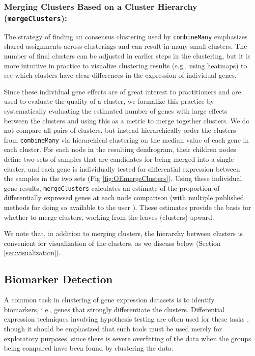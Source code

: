 \documentclass[10pt,letterpaper]{article}
\newcommand{\f}[1]{\texttt{#1}}
\begin{document}
\subsubsection{Merging Clusters Based on a Cluster Hierarchy  (\f{mergeClusters}):} 
\label{sec:dendAndMerge}

The strategy of finding an consensus clustering used by \f{combineMany} emphasizes shared assignments across clusterings and can result in many small clusters. The number of final clusters can be adjusted in earlier steps in the clustering, but it is more intuitive in practice to visualize clustering results (e.g., using heatmaps) to see which clusters have clear differences in the expression of individual genes. 

Since these individual gene effects are of great interest to practitioners and are used to evaluate the quality of a cluster, we formalize this practice by systematically evaluating the estimated number of genes with large effects between the clusters and using this as a metric to merge together clusters.  We do not compare all pairs of clusters, but instead hierarchically order the clusters from \f{combineMany} via hierarchical clustering on the median value of each gene in each cluster. For each node in the resulting dendrogram, their children nodes define two sets of samples that are candidates for being merged into a single cluster, and each gene is individually tested for differential expression between the samples in the two sets (Fig \ref{fig:OEmergeClusters}). Using these individual gene results, \f{mergeClusters} calculates an estimate of the proportion of differentially expressed genes at each node comparison (with multiple published methods for doing so available to the user \cite{Storey:2002p3799,Efron:2004p3807,Pounds:2004fd,Meinshausen:2005gp,Jin:2007dt}). These estimates provide the basis for whether to merge clusters, working from the leaves (clusters) upward.

We note that, in addition to merging clusters, the hierarchy between clusters is convenient for visualization of the clusters, as we discuss below (Section \ref{sec:visualization}).

\subsection{Biomarker Detection} \label{sec:biomarker}

A common task in clustering of gene expression datasets is to identify biomarkers, i.e., genes that strongly differentiate the clusters. Differential expression techniques involving hypothesis testing are often used for these tasks \cite{Smyth:2005fk,Robinson:2010cw,Love:2014,Finak:2015id}, though it should be emphasized that such tools must be used merely for exploratory purposes, since there is severe overfitting of the data when the groups being compared have been found by clustering the data.
\end{document}
